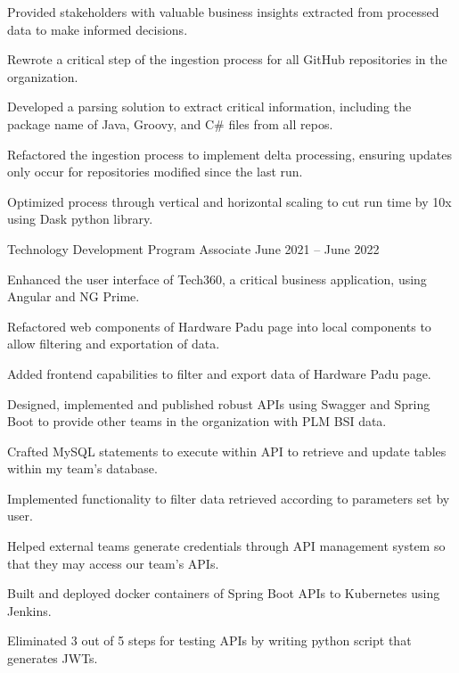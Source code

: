 \begin{cventries}
{\begin{cvitems}
        \item {Provided stakeholders with valuable business insights extracted from processed data to make informed decisions.}
        \item {Rewrote a critical step of the ingestion process for all GitHub repositories in the organization.}
        \item {Developed a parsing solution to extract critical information, including the package name of Java, Groovy, and C\# files from all repos.}
        \item {Refactored the ingestion process to implement delta processing, ensuring updates only occur for repositories modified since the last run.}
        \item {Optimized process through vertical and horizontal scaling to cut run time by 10x using Dask python library.}
      \end{cvitems}
    }
  \cventry
    {Technology Development Program Associate} %
    {} %
    {} %
    {June 2021 – June 2022} %
    {
      \begin{cvitems} %
        \item {Enhanced the user interface of Tech360, a critical business application, using Angular and NG Prime.}
        \item {Refactored web components of Hardware Padu page into local components to allow filtering and exportation of data.}
        \item {Added frontend capabilities to filter and export data of Hardware Padu page.}
        \item {Designed, implemented and published robust APIs using Swagger and Spring Boot to provide other teams in the organization with PLM BSI data.}
        \item {Crafted MySQL statements to execute within API to retrieve and update tables within my team's database.}
        \item {Implemented functionality to filter data retrieved according to parameters set by user.}
        \item {Helped external teams generate credentials through API management system so that they may access our team's APIs.}
        \item {Built and deployed docker containers of Spring Boot APIs to Kubernetes using Jenkins.}
        \item {Eliminated 3 out of 5 steps for testing APIs by writing python script that generates JWTs.}
      \end{cvitems}
    }

\end{cventries}
